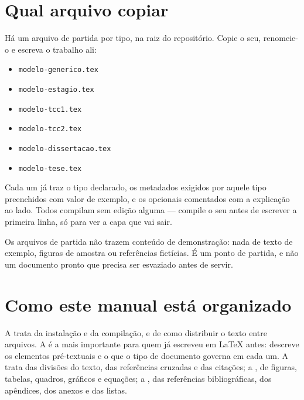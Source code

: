 \section{Qual arquivo copiar}\label{sec:qual-arquivo}

Há um arquivo de partida por tipo, na raiz do repositório. Copie o seu, renomeie-o e escreva o
trabalho ali:

\begin{itemize}
    \item \texttt{modelo-generico.tex}
    \item \texttt{modelo-estagio.tex}
    \item \texttt{modelo-tcc1.tex}
    \item \texttt{modelo-tcc2.tex}
    \item \texttt{modelo-dissertacao.tex}
    \item \texttt{modelo-tese.tex}
\end{itemize}

Cada um já traz o tipo declarado, os metadados exigidos por aquele tipo preenchidos com valor de
exemplo, e os opcionais comentados com a explicação ao lado. Todos compilam sem edição alguma ---
compile o seu antes de escrever a primeira linha, só para ver a capa que vai sair.

Os arquivos de partida não trazem conteúdo de demonstração: nada de texto de exemplo, figuras de
amostra ou referências fictícias. É um ponto de partida, e não um documento pronto que precisa ser
esvaziado antes de servir.

\section{Como este manual está organizado}\label{sec:organizacao-manual}

A  trata da instalação e da compilação, e de como distribuir o texto entre
arquivos. A  é a mais importante para quem já escreveu em \LaTeX{} antes:
descreve os elementos pré-textuais e o que o tipo de documento governa em cada um. A
 trata das divisões do texto, das referências cruzadas e das citações; a
, de figuras, tabelas, quadros, gráficos e equações; a
, das referências bibliográficas, dos apêndices, dos anexos e das listas.
